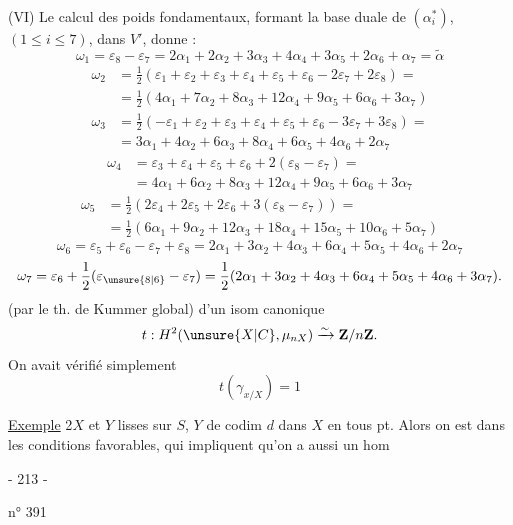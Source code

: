 (VI) Le calcul des poids fondamentaux, formant la base duale de $(\alpha_i^*)$, $(1\leq i\leq7)$, dans $V'$, donne :
\[
\omega_1=\varepsilon_8-\varepsilon_7=2\alpha_1+2\alpha_2+3\alpha_3+4\alpha_4+3\alpha_5+2\alpha_6+\alpha_7=\widetilde\alpha
\]
\[
\begin{split}
\omega_2&=\frac12(\varepsilon_1+\varepsilon_2+\varepsilon_3+\varepsilon_4+\varepsilon_5+\varepsilon_6-2\varepsilon_7+2\varepsilon_8)=\\
&=\frac12(4\alpha_1+7\alpha_2+8\alpha_3+12\alpha_4+9\alpha_5+6\alpha_6+3\alpha_7)
\end{split}
\]
\[
\begin{split}
\omega_3&=\frac12(-\varepsilon_1+\varepsilon_2+\varepsilon_3+\varepsilon_4+\varepsilon_5+\varepsilon_6-3\varepsilon_7+3\varepsilon_8)=\\
&=3\alpha_1+4\alpha_2+6\alpha_3+8\alpha_4+6\alpha_5+4\alpha_6+2\alpha_7
\end{split}
\]
\[
\begin{split}
\omega_4&=\varepsilon_3+\varepsilon_4+\varepsilon_5+\varepsilon_6+2(\varepsilon_8-\varepsilon_7)=\\
&=4\alpha_1+6\alpha_2+8\alpha_3+12\alpha_4+9\alpha_5+6\alpha_6+3\alpha_7
\end{split}
\]
\[
\begin{split}
\omega_5&=\frac12(2\varepsilon_4+2\varepsilon_5+2\varepsilon_6+3(\varepsilon_8-\varepsilon_7))=\\
&=\frac12(6\alpha_1+9\alpha_2+12\alpha_3+18\alpha_4+15\alpha_5+10\alpha_6+5\alpha_7)
\end{split}
\]
\[
\omega_6=\varepsilon_5+\varepsilon_6-\varepsilon_7+\varepsilon_8=2\alpha_1+3\alpha_2+4\alpha_3+6\alpha_4+5\alpha_5+4\alpha_6+2\alpha_7
\]
\[
\omega_7=\varepsilon_6+\frac12(\varepsilon_{\unsure{8|6}}-\varepsilon_7)=\frac12(2\alpha_1+3\alpha_2+4\alpha_3+6\alpha_4+5\alpha_5+4\alpha_6+3\alpha_7).
\]
(par le th. de Kummer global)
d'un isom canonique
\[
t:H^2(\unsure{X|C},\mu_{nX})\xrightarrow{\sim}\mathbf Z/n\mathbf Z.
\]
On avait vérifié simplement
\[
t(\gamma_{x/X})=1
\]

\uline{Exemple} 2\quad $X$ et $Y$ lisses sur $S$, $Y$ de codim $d$ dans $X$ en tous pt. Alors on est dans les conditions favorables, qui impliquent qu'on a aussi un hom
\begin{center}- 213 -\end{center}
\hfill n° 391

